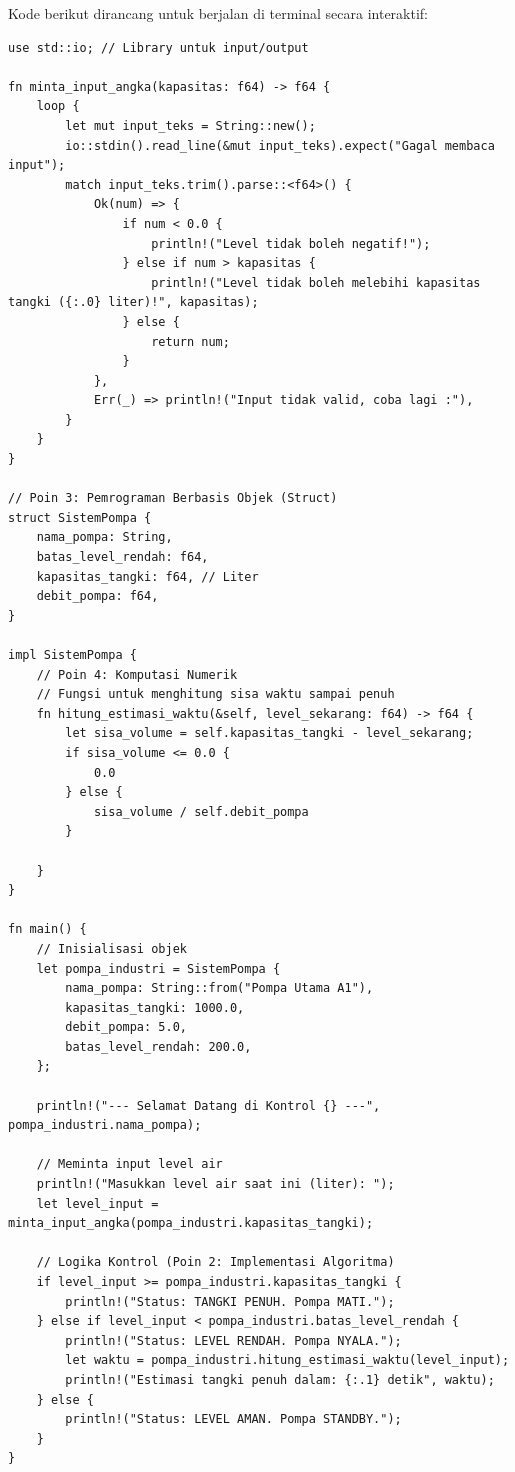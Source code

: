 \documentclass[12pt,a4paper]{article}
\begin{document}
Kode berikut dirancang untuk berjalan di terminal secara interaktif:

\begin{lstlisting}[caption=Program Monitoring Tangki Interaktif]
use std::io; // Library untuk input/output

fn minta_input_angka(kapasitas: f64) -> f64 {
    loop {
        let mut input_teks = String::new();
        io::stdin().read_line(&mut input_teks).expect("Gagal membaca input");
        match input_teks.trim().parse::<f64>() {
            Ok(num) => {
                if num < 0.0 {
                    println!("Level tidak boleh negatif!");
                } else if num > kapasitas {
                    println!("Level tidak boleh melebihi kapasitas tangki ({:.0} liter)!", kapasitas);
                } else {
                    return num;
                }
            },
            Err(_) => println!("Input tidak valid, coba lagi :"),
        }
    }
}

// Poin 3: Pemrograman Berbasis Objek (Struct)
struct SistemPompa {
    nama_pompa: String,
    batas_level_rendah: f64,
    kapasitas_tangki: f64, // Liter
    debit_pompa: f64, 
}

impl SistemPompa {
    // Poin 4: Komputasi Numerik
    // Fungsi untuk menghitung sisa waktu sampai penuh
    fn hitung_estimasi_waktu(&self, level_sekarang: f64) -> f64 {
        let sisa_volume = self.kapasitas_tangki - level_sekarang;
        if sisa_volume <= 0.0 {
            0.0
        } else {
            sisa_volume / self.debit_pompa
        }
        
    }
}

fn main() {
    // Inisialisasi objek
    let pompa_industri = SistemPompa {
        nama_pompa: String::from("Pompa Utama A1"),
        kapasitas_tangki: 1000.0,
        debit_pompa: 5.0,
        batas_level_rendah: 200.0,
    };

    println!("--- Selamat Datang di Kontrol {} ---", pompa_industri.nama_pompa);
    
    // Meminta input level air
    println!("Masukkan level air saat ini (liter): ");
    let level_input = minta_input_angka(pompa_industri.kapasitas_tangki);

    // Logika Kontrol (Poin 2: Implementasi Algoritma)
    if level_input >= pompa_industri.kapasitas_tangki {
        println!("Status: TANGKI PENUH. Pompa MATI.");
    } else if level_input < pompa_industri.batas_level_rendah {
        println!("Status: LEVEL RENDAH. Pompa NYALA.");
        let waktu = pompa_industri.hitung_estimasi_waktu(level_input);
        println!("Estimasi tangki penuh dalam: {:.1} detik", waktu);
    } else {
        println!("Status: LEVEL AMAN. Pompa STANDBY.");
    }
}

\end{lstlisting}
\end{document}
